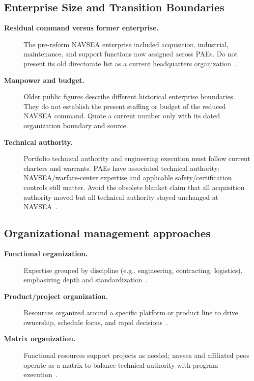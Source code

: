 \documentclass[../main.tex]{subfiles}
\begin{document}
\subsection{Enterprise Size and Transition Boundaries}
\begin{description}
  \item[\textbf{Residual command versus former enterprise.}] The pre-reform NAVSEA enterprise included acquisition, industrial, maintenance, and support functions now assigned across PAEs. Do not present its old directorate list as a current headquarters organization~\autocite{DON-PAE-Expansion-May2026,DVIDS-Weeks-PAEIO-Aug2026}.
  \item[\textbf{Manpower and budget.}] Older public figures describe different historical enterprise boundaries. They do not establish the present staffing or budget of the reduced NAVSEA command. Quote a current number only with its dated organization boundary and source.
  \item[\textbf{Technical authority.}] Portfolio technical authority and engineering execution must follow current charters and warrants. PAEs have associated technical authority; NAVSEA/warfare-center expertise and applicable safety/certification controls still matter. Avoid the obsolete blanket claim that all acquisition authority moved but all technical authority stayed unchanged at NAVSEA~\autocite{DON-PAE-Expansion-May2026,edo-2-1-2-navsea-organization-2025}.
\end{description}

\subsection{Organizational management approaches}
\begin{description}
  \item[\textbf{Functional organization.}] Expertise grouped by discipline (e.g., engineering, contracting, logistics), emphasizing depth and standardization~\autocite{edo-2-1-2-navsea-organization-2025}.
  \item[\textbf{Product/project organization.}] Resources organized around a specific platform or product line to drive ownership, schedule focus, and rapid decisions~\autocite{edo-2-1-2-navsea-organization-2025}.
  \item[\textbf{Matrix organization.}] Functional resources support projects as needed; \ac{navsea} and affiliated \acp{peo} operate as a matrix to balance technical authority with program execution~\autocite{edo-2-1-2-navsea-organization-2025}.
\end{description}
\end{document}
